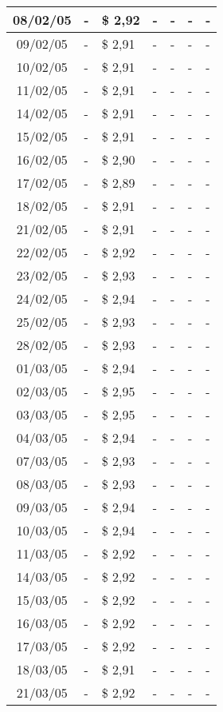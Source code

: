 \begin{center}
\begin{longtable}{|c|p{1.5cm}|p{1.5cm}|p{1.5cm}|p{1.5cm}|p{1.5cm}|p{1.5cm}|}
08/02/05 & - & \$ 2,92 & - & - & - & - \\ \hline
09/02/05 & - & \$ 2,91 & - & - & - & - \\ \hline
10/02/05 & - & \$ 2,91 & - & - & - & - \\ \hline
11/02/05 & - & \$ 2,91 & - & - & - & - \\ \hline
14/02/05 & - & \$ 2,91 & - & - & - & - \\ \hline
15/02/05 & - & \$ 2,91 & - & - & - & - \\ \hline
16/02/05 & - & \$ 2,90 & - & - & - & - \\ \hline
17/02/05 & - & \$ 2,89 & - & - & - & - \\ \hline
18/02/05 & - & \$ 2,91 & - & - & - & - \\ \hline
21/02/05 & - & \$ 2,91 & - & - & - & - \\ \hline
22/02/05 & - & \$ 2,92 & - & - & - & - \\ \hline
23/02/05 & - & \$ 2,93 & - & - & - & - \\ \hline
24/02/05 & - & \$ 2,94 & - & - & - & - \\ \hline
25/02/05 & - & \$ 2,93 & - & - & - & - \\ \hline
28/02/05 & - & \$ 2,93 & - & - & - & - \\ \hline
01/03/05 & - & \$ 2,94 & - & - & - & - \\ \hline
02/03/05 & - & \$ 2,95 & - & - & - & - \\ \hline
03/03/05 & - & \$ 2,95 & - & - & - & - \\ \hline
04/03/05 & - & \$ 2,94 & - & - & - & - \\ \hline
07/03/05 & - & \$ 2,93 & - & - & - & - \\ \hline
08/03/05 & - & \$ 2,93 & - & - & - & - \\ \hline
09/03/05 & - & \$ 2,94 & - & - & - & - \\ \hline
10/03/05 & - & \$ 2,94 & - & - & - & - \\ \hline
11/03/05 & - & \$ 2,92 & - & - & - & - \\ \hline
14/03/05 & - & \$ 2,92 & - & - & - & - \\ \hline
15/03/05 & - & \$ 2,92 & - & - & - & - \\ \hline
16/03/05 & - & \$ 2,92 & - & - & - & - \\ \hline
17/03/05 & - & \$ 2,92 & - & - & - & - \\ \hline
18/03/05 & - & \$ 2,91 & - & - & - & - \\ \hline
21/03/05 & - & \$ 2,92 & - & - & - & - \\ \hline

\end{longtable}
\end{center}
